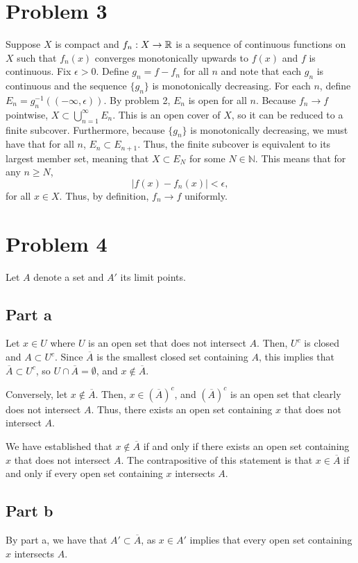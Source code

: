 \documentclass{article}
\begin{document}
\section{Problem 3}
Suppose $X$ is compact and $f_n:X\to\mathbb{R}$ is a sequence of continuous functions on $X$ such that $f_n(x)$ converges monotonically upwards to $f(x)$ and $f$ is continuous. Fix $\epsilon>0$. Define $g_n=f-f_n$ for all $n$ and note that each $g_n$ is continuous and the sequence $\{g_n\}$ is monotonically decreasing. For each $n$, define $E_n=g_n^{-1}\left((-\infty,\epsilon)\right)$. By problem 2, $E_n$ is open for all $n$. Because $f_n\to f$ pointwise, $X\subset \bigcup_{n=1}^\infty E_n$. This is an open cover of $X$, so it can be reduced to a finite subcover. Furthermore, because $\{g_n\}$ is monotonically decreasing, we must have that for all $n$, $E_n\subset E_{n+1}$. Thus, the finite subcover is equivalent to its largest member set, meaning that $X\subset E_N$ for some $N\in\mathbb{N}$. This means that for any $n\geq N$, 
\[
|f(x)-f_n(x)|<\epsilon,
\]
for all $x\in X$. Thus, by definition, $f_n\to f$ uniformly.

\section{Problem 4}
Let $A$ denote a set and $A'$ its limit points.

\subsection{Part a}
Let $x\in U$ where $U$ is an open set that does not intersect $A$. Then, $U^c$ is closed and $A\subset U^c$. Since $\overline A$ is the smallest closed set containing $A$, this implies that $\overline A\subset U^c$, so $U\cap \overline A=\emptyset$, and $x\notin \overline{A}$.

Conversely, let $x\notin\overline A$. Then, $x\in\left(\overline A\right)^c$, and $\left(\overline A\right)^c$ is an open set that clearly does not intersect $A$. Thus, there exists an open set containing $x$ that does not intersect $A$.

We have established that $x\notin \overline A$ if and only if there exists an open set containing $x$ that does not intersect $A$. The contrapositive of this statement is that $x\in\overline A$ if and only if every open set containing $x$ intersects $A$.

\subsection{Part b}
By part a, we have that $A'\subset \overline A$, as $x\in A'$ implies that every open set containing $x$ intersects $A$.
\end{document}
